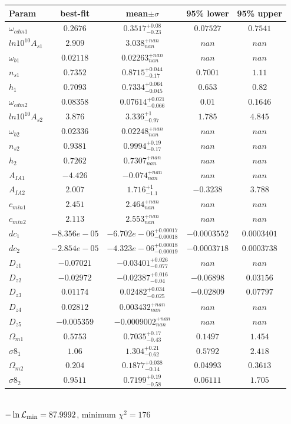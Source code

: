 \begin{tabular}{|l|c|c|c|c|} 
 \hline 
Param & best-fit & mean$\pm\sigma$ & 95\% lower & 95\% upper \\ \hline 
$\omega_{cdm 1 }$ &$0.2676$ & $0.3517_{-0.23}^{+0.08}$ & $0.07527$ & $0.7541$ \\ 
$ln10^{10}A_{s 1 }$ &$2.909$ & $3.038_{nan}^{+nan}$ & $nan$ & $nan$ \\ 
$\omega_{b 1 }$ &$0.02118$ & $0.02263_{nan}^{+nan}$ & $nan$ & $nan$ \\ 
$n_{s 1 }$ &$0.7352$ & $0.8715_{-0.17}^{+0.044}$ & $0.7001$ & $1.11$ \\ 
$h_{1 }$ &$0.7093$ & $0.7334_{-0.045}^{+0.064}$ & $0.653$ & $0.82$ \\ 
$\omega_{cdm 2 }$ &$0.08358$ & $0.07614_{-0.066}^{+0.021}$ & $0.01$ & $0.1646$ \\ 
$ln10^{10}A_{s 2 }$ &$3.876$ & $3.336_{-0.97}^{+1}$ & $1.785$ & $4.845$ \\ 
$\omega_{b 2 }$ &$0.02336$ & $0.02248_{nan}^{+nan}$ & $nan$ & $nan$ \\ 
$n_{s 2 }$ &$0.9381$ & $0.9994_{-0.17}^{+0.19}$ & $nan$ & $nan$ \\ 
$h_{2 }$ &$0.7262$ & $0.7307_{nan}^{+nan}$ & $nan$ & $nan$ \\ 
$A_{IA 1 }$ &$-4.426$ & $-0.074_{nan}^{+nan}$ & $nan$ & $nan$ \\ 
$A_{IA 2 }$ &$2.007$ & $1.716_{-1.1}^{+1}$ & $-0.3238$ & $3.788$ \\ 
$c_{min 1 }$ &$2.451$ & $2.464_{nan}^{+nan}$ & $nan$ & $nan$ \\ 
$c_{min 2 }$ &$2.113$ & $2.553_{nan}^{+nan}$ & $nan$ & $nan$ \\ 
$dc_{1 }$ &$-8.356e-05$ & $-6.702e-06_{-0.00018}^{+0.00017}$ & $-0.0003552$ & $0.0003401$ \\ 
$dc_{2 }$ &$-2.854e-05$ & $-4.323e-06_{-0.00019}^{+0.00018}$ & $-0.0003718$ & $0.0003738$ \\ 
$D_{z1 }$ &$-0.07021$ & $-0.03401_{-0.077}^{+0.026}$ & $nan$ & $nan$ \\ 
$D_{z2 }$ &$-0.02972$ & $-0.02387_{-0.04}^{+0.016}$ & $-0.06898$ & $0.03156$ \\ 
$D_{z3 }$ &$0.01174$ & $0.02482_{-0.025}^{+0.034}$ & $-0.02809$ & $0.07797$ \\ 
$D_{z4 }$ &$0.02812$ & $0.003432_{nan}^{+nan}$ & $nan$ & $nan$ \\ 
$D_{z5 }$ &$-0.005359$ & $-0.0009002_{nan}^{+nan}$ & $nan$ & $nan$ \\ 
$\Omega_{m 1 }$ &$0.5753$ & $0.7035_{-0.43}^{+0.17}$ & $0.1497$ & $1.454$ \\ 
$\sigma8_{1 }$ &$1.06$ & $1.304_{-0.62}^{+0.21}$ & $0.5792$ & $2.418$ \\ 
$\Omega_{m 2 }$ &$0.204$ & $0.1877_{-0.14}^{+0.038}$ & $0.04993$ & $0.3613$ \\ 
$\sigma8_{2 }$ &$0.9511$ & $0.7199_{-0.58}^{+0.19}$ & $0.06111$ & $1.705$ \\ 
\hline 
 \end{tabular} \\ 
$-\ln{\cal L}_\mathrm{min} =87.9992$, minimum $\chi^2=176$ \\ 
